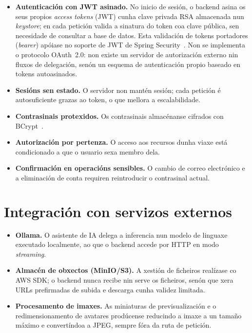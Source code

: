 \begin{itemize}
  \item \textbf{Autenticación con JWT asinado.} No inicio de sesión, o backend asina os
        seus propios \textit{access tokens} (JWT) cunha clave privada RSA almacenada nun
        \textit{keystore}; en cada petición valida a sinatura do token coa clave pública,
        sen necesidade de consultar a base de datos. Esta validación de tokens portadores
        (\textit{bearer}) apóiase no soporte de JWT de Spring Security~\cite{springsecurity}.
        Non se implementa o protocolo OAuth~2.0: non existe un servidor de autorización
        externo nin fluxos de delegación, senón un esquema de autenticación propio baseado
        en tokens autoasinados.
  \item \textbf{Sesións sen estado.} O servidor non mantén sesión; cada petición é
        autosuficiente grazas ao token, o que mellora a escalabilidade.
  \item \textbf{Contrasinais protexidos.} Os contrasinais almacénanse cifrados con
        BCrypt~\cite{bcrypt}.
  \item \textbf{Autorización por pertenza.} O acceso aos recursos dunha viaxe está
        condicionado a que o usuario sexa membro dela.
  \item \textbf{Confirmación en operacións sensibles.} O cambio de correo electrónico e a
        eliminación de conta requiren reintroducir o contrasinal actual.
\end{itemize}

\section{Integración con servizos externos}

\begin{itemize}
  \item \textbf{Ollama.} O asistente de IA delega a inferencia nun modelo de linguaxe
        executado localmente, ao que o backend accede por HTTP en modo \textit{streaming}.
  \item \textbf{Almacén de obxectos (MinIO/S3).} A xestión de ficheiros realízase co AWS
        SDK; o backend nunca recibe nin serve os ficheiros, senón que xera URLs
        prefirmadas de subida e descarga cunha validez limitada.
  \item \textbf{Procesamento de imaxes.} As miniaturas de previsualización e o
        redimensionamento de avatares prodúcense reducindo a imaxe a un tamaño máximo e
        convertíndoa a JPEG, sempre fóra da ruta de petición.
\end{itemize}

